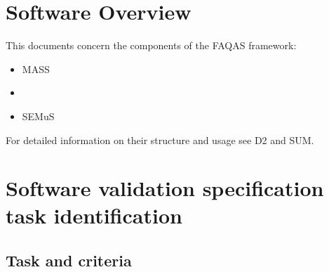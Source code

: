 \chapter{Software Overview}

This documents concern the components of the FAQAS framework:
\begin{itemize}
  \item MASS
  \item \DAMA
  \item SEMuS
\end{itemize}

For detailed information on their structure and usage see D2 and SUM.

\chapter{Software validation specification task identification}

\STARTCHANGEDFINAL

\section{Task and criteria}
\label{sec:taskCrit}

